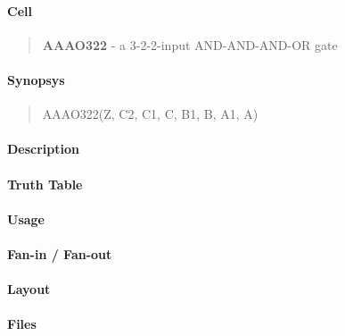 \label{AAAO322}
\paragraph{Cell}
\begin{quote}
    \textbf{AAAO322} - a 3-2-2-input AND-AND-AND-OR gate
\end{quote}

\paragraph{Synopsys}
\begin{quote}
    AAAO322(Z, C2, C1, C, B1, B, A1, A)
\end{quote}

\paragraph{Description}

%

\paragraph{Truth Table}
%

\paragraph{Usage}

\paragraph{Fan-in / Fan-out}

\paragraph{Layout}

\paragraph{Files}
